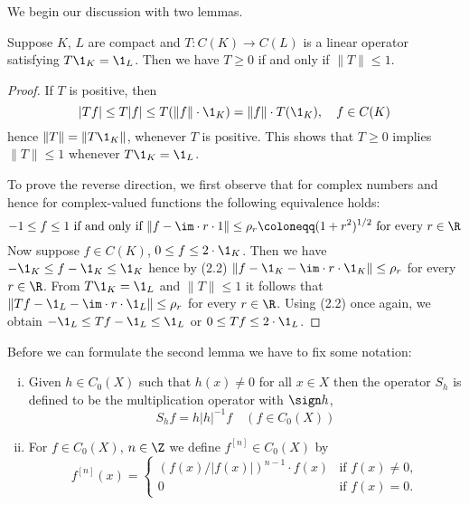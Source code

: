 We begin our discussion with two lemmas.

\begin{lemma}\label{lem:b3-2.1}
	Suppose $K$, $L$ are compact and $T \colon C(K) \to C(L)$ is a linear operator satisfying $T \1_{K} = \1_{L}$.
	Then we have $T \geq 0$ if and only if $\|T\| \leq 1$.
\end{lemma}
\begin{proof}
	If $T$ is positive, then
	\begin{equation}\label{eq:b3-2.1}
	|Tf| \leq T|f| \leq T(\|f\|\cdot \1_{K}) = \|f\|\cdot T(\1_{K}), \quad f \in C(K)
	\end{equation}
	hence $\|T\| = \|T\1_{K}\|$, whenever $T$ is positive.
	This shows that $T \geq 0$ implies $\|T\| \leq 1$ whenever $T\1_{K} = \1_{L}$.
	
	To prove the reverse direction, we first observe that for complex numbers and hence for complex-valued functions the following equivalence holds:
	\begin{equation}\label{eq:b3-2.2}
	-1 \leq f \leq 1 \text{ if and only if } \|f - \im\cdot r\cdot 1\| \leq \rho_{r} \coloneqq (1+r^{2})^{1/2} \text{ for every } r \in \R
	\end{equation}
	Now suppose $f \in C(K)$, $0 \leq f \leq 2\cdot \1_{K}$.
	Then we have $-\1_{K} \leq f - \1_{K} \leq \1_{K}$ hence by (2.2) $\|f - \1_{K} - \im\cdot r\cdot \1_{K}\| \leq \rho_{r}$ for every $r \in \R$.
	From $T\1_{K} = \1_{L}$ and $\|T\| \leq 1$ it follows that $\|Tf - \1_{L} - \im\cdot r\cdot \1_{L}\| \leq \rho_{r}$ for every $r \in \R$.
	Using (2.2) once again, we obtain $-\1_{L} \leq Tf - \1_{L} \leq \1_{L}$ or $0 \leq Tf \leq 2\cdot \1_{L}$.
\end{proof}
%		
Before we can formulate the second lemma we have to fix some notation:
	\begin{definition}\label{def:b3-2.2}
\begin{enumerate}[(i)]
		
\item
Given $h \in C_{0}(X)$ such that $h(x) \neq 0$ for all $x \in X$ then the operator $S_{h}$ is defined to be the multiplication operator with $ \sign h $, \ie
		\begin{equation}\label{eq:b3-2.3}
			S_{h}f = h|h|^{-1}f \quad (f \in C_{0}(X))
		\end{equation}
		
\item
For $f \in C_{0}(X)$, $n \in \Z$ we define $f^{[n]} \in C_{0}(X)$ by
\begin{equation}\label{eq:b3-2.4}
	f^{[n]}(x) = 
	\begin{cases}
			(f(x)/|f(x)|)^{n-1}\cdot f(x) & \text{if } f(x) \neq 0 ,\\			
			0 & \text{if } f(x) = 0 .
			\end{cases}
\end{equation}
\end{enumerate}
\end{definition}
